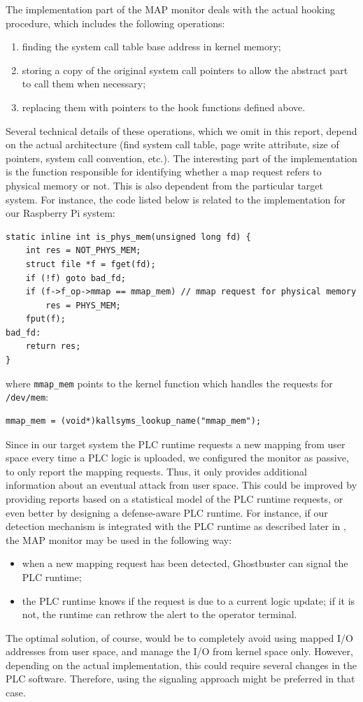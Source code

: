The implementation part of the MAP monitor deals with the actual hooking procedure, which includes the following operations:
\begin{enumerate}
	\item finding the system call table base address in kernel memory;
	\item storing a copy of the original system call pointers to allow the abstract part to call them when necessary;
	\item replacing them with pointers to the hook functions defined above.
\end{enumerate}
Several technical details of these operations, which we omit in this report, depend on the actual architecture
(\eg find system call table, page write attribute, size of pointers, system call convention, etc.).
The interesting part of the implementation is the function responsible for identifying whether a map request refers to physical memory or not.
This is also dependent from the particular target system.
For instance, the code listed below is related to the  implementation for our Raspberry Pi system:
\begin{lstlisting}
static inline int is_phys_mem(unsigned long fd) {
	int res = NOT_PHYS_MEM;
	struct file *f = fget(fd);
	if (!f) goto bad_fd;
	if (f->f_op->mmap == mmap_mem) // mmap request for physical memory
		res = PHYS_MEM;
	fput(f);
bad_fd:
	return res;
}
\end{lstlisting}
where \verb|mmap_mem| points to the kernel function which handles the requests for \verb|/dev/mem|:
\begin{lstlisting}
mmap_mem = (void*)kallsyms_lookup_name("mmap_mem");
\end{lstlisting}

Since in our target system the PLC runtime requests a new mapping from user space every time a PLC logic is uploaded,
we configured the monitor as passive, to only report the mapping requests. Thus, it only provides additional information about an eventual attack from user space.
This could be improved by providing reports based on a statistical model of the PLC runtime requests, or even better by designing a defense-aware PLC runtime.
For instance, if our detection mechanism is integrated with the PLC runtime as described later in , the MAP monitor may be used in the following way:
\begin{itemize}
	\item when a new mapping request has been detected, Ghostbuster can signal the PLC runtime;
	\item the PLC runtime knows if the request is due to a current logic update; if it is not, the runtime can rethrow the alert to the operator terminal.
\end{itemize}
The optimal solution, of course, would be to completely avoid using mapped I/O addresses from user space, and manage the I/O from kernel space only.
However, depending on the actual implementation, this could require several changes in the PLC software. Therefore, using the signaling approach might be preferred in that case.



